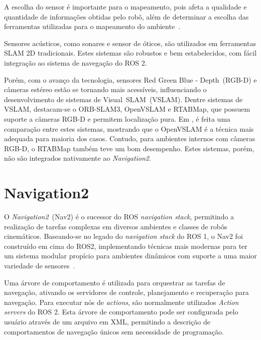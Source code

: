 \documentclass[repeatfields,xlists,xpacks,oneside,yearsonly]{ufrgscca}
\begin{document}
A escolha do sensor é importante para o mapeamento, pois afeta a
qualidade e quantidade de informações obtidas pelo robô, além de
determinar a escolha das ferramentas utilizadas para o mapeamento do
ambiente~\cite{SensorAndSLAM}.

Sensores acústicos, como sonares e sensor de óticos, são utilizados
em ferramentas SLAM 2D tradicionais. Estes sistemas são robustos e
bem estabelecidos, com fácil integração ao sistema de navegação do
ROS 2.

Porém, com o avanço da tecnologia, sensores Red Green Blue -
Depth~(RGB-D) e câmeras estéreo estão se tornando mais acessíveis,
influenciando o desenvolvimento de sistemas de Visual~SLAM~(VSLAM).
Dentre sistemas de VSLAM, destacam-se o ORB-SLAM3, OpenVSLAM e
RTABMap, que possuem suporte a câmeras RGB-D e permitem localização
pura. Em \textcite{VSLAM}, é feita uma comparação entre estes
sistemas, mostrando que o OpenVSLAM é a técnica mais adequada para
maioria dos casos. Contudo, para ambientes internos com câmeras
RGB-D, o RTABMap também teve um bom desempenho. Estes sistemas,
porém, não são integrados nativamente ao \textit{Navigation2}.


\section{Navigation2}

O \textit{Navigation2}~(Nav2) é o sucessor do ROS \textit{navigation
    stack}, permitindo a realização de tarefas complexas em diversos
ambientes e classes de robôs cinemáticos. Baseando-se no legado do
\textit{navigation stack} do ROS 1, o Nav2 foi construído em cima do
ROS2, implementando técnicas mais modernas para ter um sistema
modular propício para ambientes dinâmicos com suporte a uma maior
variedade de sensores~\cite{Nav2}.

Uma árvore de comportamento é utilizada para orquestrar as tarefas de
navegação, ativando os servidores de controle, planejamento e
recuperação para navegação. Para executar nós de \textit{actions},
são normalmente utilizados \textit{Action servers} do ROS 2. Esta
árvore de comportamento pode ser configurada pelo usuário através de
um arquivo em XML, permitindo a descrição de comportamentos de
navegação únicos sem necessidade de programação.
\end{document}
